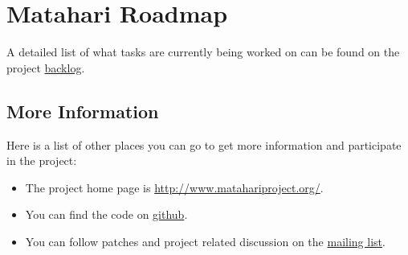 \section{Matahari Roadmap}

A detailed list of what tasks are currently being worked on can be found on the project \href{https://github.com/matahari/matahari/wiki/Backlog}{backlog}. 

\subsection{More Information}

Here is a list of other places you can go to get more information and participate in the project:

\begin{itemize}
\item The project home page is \url{http://www.matahariproject.org/}.
\item You can find the code on \href{https://github.com/matahari/matahari}{github}.
\item You can follow patches and project related discussion on the \href{https://fedorahosted.org/mailman/listinfo/matahari}{mailing list}. 
\end{itemize}
